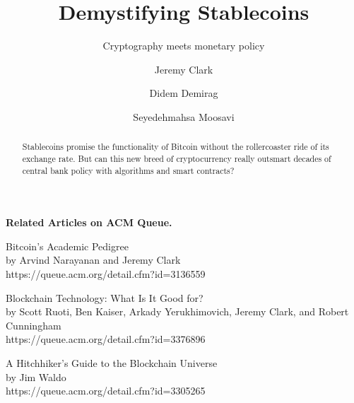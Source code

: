 \documentclass[acmlarge,screen]{acmart}
\begin{document}
\title{Demystifying Stablecoins}
\subtitle{Cryptography meets monetary policy}

\author{Jeremy Clark}

\author{Didem Demirag}

\author{Seyedehmahsa Moosavi}

\begin{abstract} Stablecoins promise the functionality of Bitcoin without the rollercoaster ride of its exchange rate. But can this new breed of cryptocurrency really outsmart decades of central bank policy with algorithms and smart contracts?\end{abstract}

\maketitle









% 

\begin{Sidebar*}[h!]
\begin{framed}
\begin{flushleft}
\textbf{Related Articles on ACM Queue.} \newline

Bitcoin’s Academic Pedigree \\
by Arvind Narayanan and Jeremy Clark \\
https://queue.acm.org/detail.cfm?id=3136559 \newline

Blockchain Technology: What Is It Good for? \\ 
by Scott Ruoti, Ben Kaiser, Arkady Yerukhimovich, Jeremy Clark, and Robert Cunningham \\
https://queue.acm.org/detail.cfm?id=3376896 \newline

A Hitchhiker’s Guide to the Blockchain Universe\\
by Jim Waldo \\
https://queue.acm.org/detail.cfm?id=3305265
\end{flushleft}
\end{framed}
\end{Sidebar*}
\end{document}
